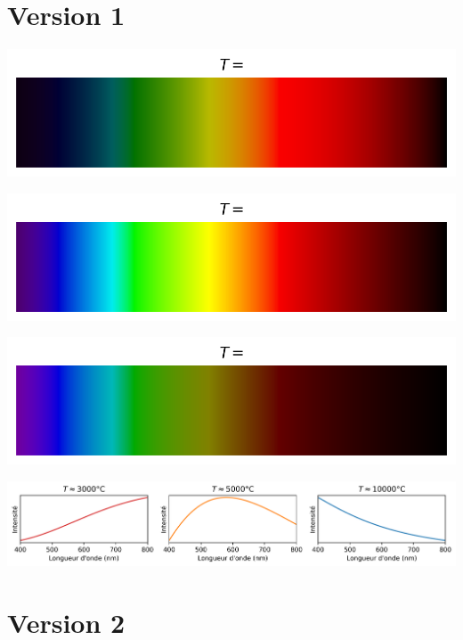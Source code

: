 \documentclass[12pt,a4paper,fleqn]{article}
\begin{document}
\begin{landscape}

\section*{Version 1}

\begin{center}
\begin{multicols}{3}
\includegraphics[width=\linewidth]{images/spectrum_black_body_temp3000K_notemp.png}

\includegraphics[width=\linewidth]{images/spectrum_black_body_temp5000K_notemp.png}

\includegraphics[width=\linewidth]{images/spectrum_black_body_temp10000K_notemp.png}
\end{multicols}

\includegraphics[width=\linewidth]{images/spectrum_black_body_curve10000K.png}
\end{center}

\section*{Version 2}


\end{landscape}
\end{document}
